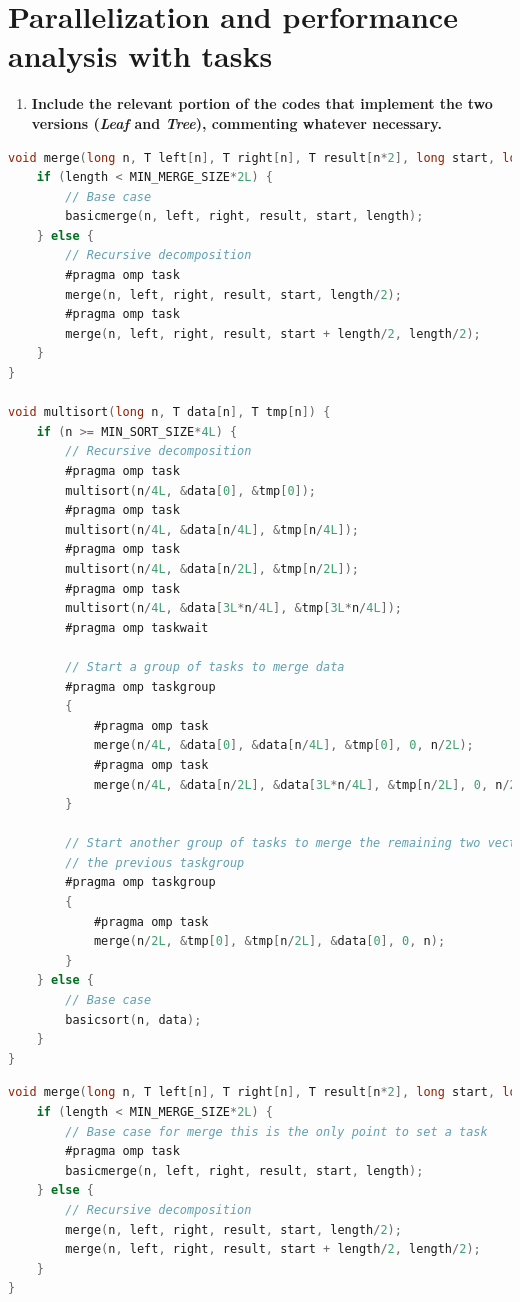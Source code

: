 \documentclass[a4paper]{article}
\newenvironment{questionenum}{%
\setlist[enumerate]{resume}
\restartlist{enumerate}
\newcommand{\question}[1]{
\begin{enumerate}
	\item\bfseries ##1
\end{enumerate}
}}{%
}
\begin{document}
\section{Parallelization and performance analysis with tasks}
\begin{questionenum}
	\question{Include the relevant portion of the codes that implement the two versions (\textit{Leaf} and \textit{Tree}), commenting whatever necessary.}
	
    \begin{lstlisting}[language=C, title=\texttt{multisort-omp-tree.c}]
void merge(long n, T left[n], T right[n], T result[n*2], long start, long length) {
    if (length < MIN_MERGE_SIZE*2L) {
        // Base case
        basicmerge(n, left, right, result, start, length);
    } else {
        // Recursive decomposition
        #pragma omp task
        merge(n, left, right, result, start, length/2);
        #pragma omp task
        merge(n, left, right, result, start + length/2, length/2);
    }
}
    
void multisort(long n, T data[n], T tmp[n]) {
    if (n >= MIN_SORT_SIZE*4L) {
        // Recursive decomposition
        #pragma omp task
        multisort(n/4L, &data[0], &tmp[0]);
        #pragma omp task
        multisort(n/4L, &data[n/4L], &tmp[n/4L]);
        #pragma omp task
        multisort(n/4L, &data[n/2L], &tmp[n/2L]);
        #pragma omp task
        multisort(n/4L, &data[3L*n/4L], &tmp[3L*n/4L]);
        #pragma omp taskwait
        
        // Start a group of tasks to merge data
        #pragma omp taskgroup
        {
            #pragma omp task
            merge(n/4L, &data[0], &data[n/4L], &tmp[0], 0, n/2L);
            #pragma omp task
            merge(n/4L, &data[n/2L], &data[3L*n/4L], &tmp[n/2L], 0, n/2L);
        }
        
        // Start another group of tasks to merge the remaining two vectors, this group depends on
        // the previous taskgroup
        #pragma omp taskgroup
        {
            #pragma omp task
            merge(n/2L, &tmp[0], &tmp[n/2L], &data[0], 0, n);
        }
    } else {
        // Base case
        basicsort(n, data);
    }
}
    \end{lstlisting}
    
    
    \begin{lstlisting}[language=C, title=\texttt{multisort-omp-leaf.c}]
void merge(long n, T left[n], T right[n], T result[n*2], long start, long length) {
    if (length < MIN_MERGE_SIZE*2L) {
        // Base case for merge this is the only point to set a task
        #pragma omp task
        basicmerge(n, left, right, result, start, length);
    } else {
        // Recursive decomposition
        merge(n, left, right, result, start, length/2);
        merge(n, left, right, result, start + length/2, length/2);
    }
}


\end{lstlisting}
\end{questionenum}
\end{document}
